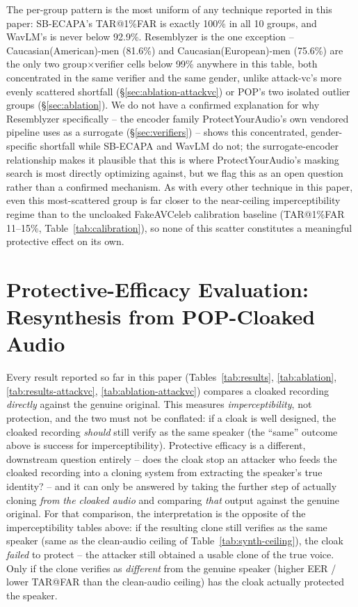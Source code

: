 \documentclass[11pt]{article}
\begin{document}
The per-group pattern is the most uniform of any technique reported in
this paper: SB-ECAPA's TAR@1\%FAR is exactly 100\% in all 10 groups,
and WavLM's is never below 92.9\%. Resemblyzer is the one exception --
Caucasian(American)-men (81.6\%) and Caucasian(European)-men (75.6\%)
are the only two group$\times$verifier cells below 99\% anywhere in
this table, both concentrated in the same verifier and the same
gender, unlike attack-vc's more evenly scattered shortfall
(\S\ref{sec:ablation-attackvc}) or POP's two isolated outlier groups
(\S\ref{sec:ablation}). We do not have a confirmed explanation for why
Resemblyzer specifically -- the encoder family ProtectYourAudio's own
vendored pipeline uses as a surrogate (\S\ref{sec:verifiers}) -- shows
this concentrated, gender-specific shortfall while SB-ECAPA and WavLM
do not; the surrogate-encoder relationship makes it plausible that
this is where ProtectYourAudio's masking search is most directly
optimizing against, but we flag this as an open question rather than a
confirmed mechanism. As with every other technique in this paper, even
this most-scattered group is far closer to the near-ceiling
imperceptibility regime than to the uncloaked FakeAVCeleb calibration
baseline (TAR@1\%FAR 11--15\%, Table~\ref{tab:calibration}), so none of
this scatter constitutes a meaningful protective effect on its own.

\section{Protective-Efficacy Evaluation: Resynthesis from POP-Cloaked Audio}
\label{sec:protective-efficacy}

Every result reported so far in this paper (Tables~\ref{tab:results},
\ref{tab:ablation}, \ref{tab:results-attackvc},
\ref{tab:ablation-attackvc}) compares a cloaked recording
\emph{directly} against the genuine original. This measures
\emph{imperceptibility}, not protection, and the two must not be
conflated: if a cloak is well designed, the cloaked recording
\emph{should} still verify as the same speaker (the ``same'' outcome
above is success for imperceptibility). Protective efficacy is a
different, downstream question entirely -- does the cloak stop an
attacker who feeds the cloaked recording into a cloning system from
extracting the speaker's true identity? -- and it can only be
answered by taking the further step of actually cloning
\emph{from the cloaked audio} and comparing \emph{that} output against
the genuine original. For that comparison, the interpretation is the
opposite of the imperceptibility tables above: if the resulting clone
still verifies as the same speaker (same as the clean-audio ceiling of
Table~\ref{tab:synth-ceiling}), the cloak \emph{failed} to protect --
the attacker still obtained a usable clone of the true voice. Only if
the clone verifies as \emph{different} from the genuine speaker
(higher EER / lower TAR@FAR than the clean-audio ceiling) has the
cloak actually protected the speaker.
\end{document}
